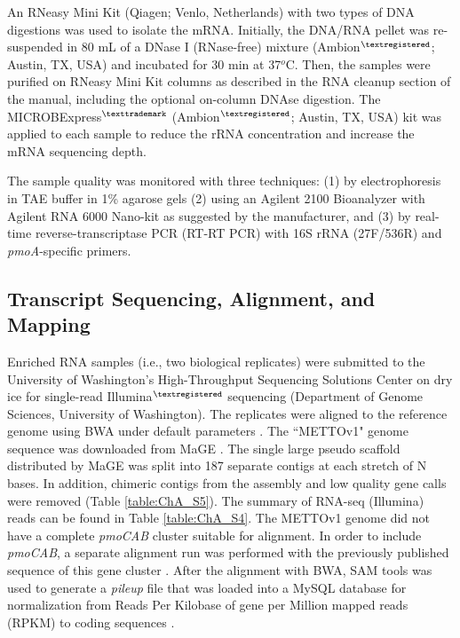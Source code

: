 An RNeasy Mini Kit (Qiagen\textcopyright; Venlo, Netherlands) with two types of DNA digestions was used to isolate the mRNA. Initially, the DNA/RNA pellet was re-suspended in 80 mL of a DNase I (RNase-free) mixture (Ambion$^{\textregistered}$; Austin, TX, USA) and incubated for 30 min at 37$^o$C.
Then, the samples were purified on RNeasy Mini Kit columns as described in the RNA cleanup section of the manual, including the optional on-column DNAse digestion.
The MICROBExpress$^{\texttrademark}$ (Ambion$^{\textregistered}$; Austin, TX, USA) kit was applied to each sample to reduce the rRNA concentration and increase the mRNA sequencing depth.

The sample quality was monitored with three techniques: (1) by electrophoresis in TAE buffer in 1\% agarose gels (2) using an Agilent 2100 Bioanalyzer with Agilent RNA 6000 Nano-kit as suggested by the manufacturer, and (3) by real-time reverse-transcriptase PCR (RT-RT PCR) with 16S rRNA (27F/536R) and \textit{pmoA}-specific \cite{auman2001} primers.

\subsection{Transcript Sequencing, Alignment, and Mapping}
Enriched RNA samples (i.e., two biological replicates) were submitted to the University of Washington’s High-Throughput Sequencing Solutions Center on dry ice for single-read Illumina$^{\textregistered}$ sequencing (Department of Genome Sciences, University of Washington).
The replicates were aligned to the reference genome using BWA under default parameters \cite{li2009}.
The ``METTOv1" genome sequence was downloaded from MaGE \cite{vallenet2006}.
The single large pseudo scaffold distributed by MaGE was split into 187 separate contigs at each stretch of N bases.
In addition, chimeric contigs from the assembly and low quality gene calls were removed (Table \ref{table:ChA_S5}).
The summary of RNA-seq (Illumina) reads can be found in Table \ref{table:ChA_S4}.
The METTOv1 genome did not have a complete \textit{pmoCAB} cluster suitable for alignment.
In order to include \textit{pmoCAB}, a separate alignment run was performed with the previously published sequence of this gene cluster \cite{holmes1995}.
After the alignment with BWA, SAM tools was used to generate a \textit{pileup} file that was loaded into a MySQL database for normalization from Reads Per Kilobase of gene per Million mapped reads (RPKM) to coding sequences \cite{mortazavi2008}.

